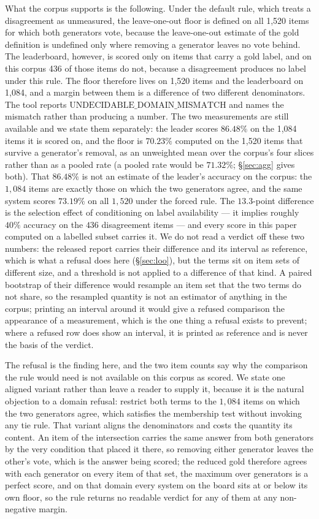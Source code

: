 \documentclass{article}
\begin{document}
What the corpus supports is the following. Under the default rule, which treats a disagreement as unmeasured, the leave-one-out floor is defined on all 1,520 items for which both generators vote, because the leave-one-out estimate of the gold definition is undefined only where removing a generator leaves no vote behind. The leaderboard, however, is scored only on items that carry a gold label, and on this corpus 436 of those items do not, because a disagreement produces no label under this rule. The floor therefore lives on 1,520 items and the leaderboard on 1,084, and a margin between them is a difference of two different denominators. The tool reports $\mathrm{UNDECIDABLE\_DOMAIN\_MISMATCH}$ and names the mismatch rather than producing a number. The two measurements are still available and we state them separately: the leader scores $86.48\%$ on the 1,084 items it is scored on, and the floor is $70.23\%$ computed on the 1,520 items that survive a generator's removal, as an unweighted mean over the corpus's four slices rather than as a pooled rate (a pooled rate would be $71.32\%$; \S\ref{sec:agg} gives both). That $86.48\%$ is not an estimate of the leader's accuracy on the corpus: the $1{,}084$ items are exactly those on which the two generators agree, and the same system scores $73.19\%$ on all $1{,}520$ under the forced rule. The $13.3$-point difference is the selection effect of conditioning on label availability --- it implies roughly $40\%$ accuracy on the $436$ disagreement items --- and every score in this paper computed on a labelled subset carries it. We do not read a verdict off these two numbers: the released report carries their difference and its interval as reference, which is what a refusal does here (\S\ref{sec:loo}), but the terms sit on item sets of different size, and a threshold is not applied to a difference of that kind. A paired bootstrap of their difference would resample an item set that the two terms do not share, so the resampled quantity is not an estimator of anything in the corpus; printing an interval around it would give a refused comparison the appearance of a measurement, which is the one thing a refusal exists to prevent; where a refused row does show an interval, it is printed as reference and is never the basis of the verdict. 

The refusal is the finding here, and the two item counts say why the comparison the rule would need is not available on this corpus as scored. We state one aligned variant rather than leave a reader to supply it, because it is the natural objection to a domain refusal: restrict both terms to the $1,084$ items on which the two generators agree, which satisfies the membership test without invoking any tie rule. That variant aligns the denominators and costs the quantity its content. An item of the intersection carries the same answer from both generators by the very condition that placed it there, so removing either generator leaves the other's vote, which is the answer being scored; the reduced gold therefore agrees with each generator on every item of that set, the maximum over generators is a perfect score, and on that domain every system on the board sits at or below its own floor, so the rule returns no readable verdict for any of them at any non-negative margin. 
\end{document}
